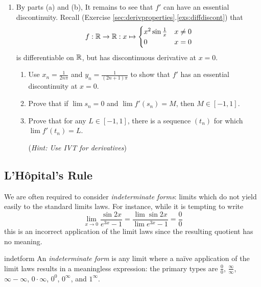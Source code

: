 \begin{exercises}{}
\begin{enumerate}
\begin{enumerate}
	  	\item By parts (a) and (b), It remains to see that $f'$ can have an essential discontinuity. Recall (Exercise \ref*{sec:derivproperties}.\ref{exs:diffdiscont}) that
			\[
				f:\mathbb{R}\to\mathbb{R}:x\mapsto 
				\begin{cases}
					x^2\sin\frac 1x&x\neq 0\\
					0&x=0
				\end{cases}
			\]
			is differentiable on $\mathbb{R}$, but has discontinuous derivative at $x=0$.
			\begin{enumerate}
	  		\item Use $x_n=\frac 1{2n\pi}$ and $y_n=\frac 1{(2n+1)\pi}$ to show that $f'$ has an essential discontinuity at $x=0$.
	  		\item Prove that if $\lim s_n=0$ and $\lim f'(s_n)=M$, then $M\in[-1,1]$.
				\item Prove that for any $L\in[-1,1]$, there is a sequence $(t_n)$ for which $\lim\limits f'(t_n)=L$.\par
				(\emph{Hint: Use IVT for derivatives})
			\end{enumerate}
	  \end{enumerate}
	\end{enumerate}
\end{exercises}


\goodbreak


\subsection{L'Hôpital's Rule}\label{sec:lhopital}

We are often required to consider \emph{indeterminate forms}: limits which do not yield easily to the standard limits laws. For instance, while it is tempting to write
\[
	\lim_{x\to 0}\frac{\sin 2x}{e^{3x}-1}
	=\frac{\lim\sin 2x}{\lim e^{3x}-1}
	=\frac 00 \tag{$\ast$}
\]
this is an incorrect application of the limit laws since the resulting quotient has no meaning.

\begin{defn}{}{indetform}
	An \emph{indeterminate form} is any limit where a naïve application of the limit laws results in a meaningless expression: the primary types are $\frac 00$, $\frac\infty\infty$, $\infty-\infty$, $0\cdot\infty$, $0^0$, $0^\infty$, and $1^\infty$.
\end{defn}

